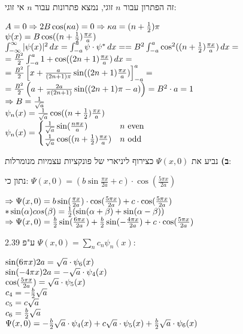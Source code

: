 \documentclass[14pt]{extarticle}
\makeatletter
\newenvironment{lefteqs}{%
    \begin{english}%
    \begin{flushleft}%
    \renewcommand{\arraystretch}{1.3}%
    $\begin{array}{@{}l@{}}%
}{%
    \end{array}$%
    \end{flushleft}%
    \end{english}%
}
\makeatother
\begin{document}
זה הפתרון עבור $n$ זוגי, נמצא פתרונות עבור $n$ אי זוגי:
\begin{lefteqs}
    A=0 \Rightarrow 2B\cos(\kappa a)=0 \Rightarrow \kappa a = (n+\frac{1}{2})\pi \\
    \psi(x) = B \cos((n+\frac{1}{2})\frac{\pi x}{a}) \\

    \int_{-\infty}^{\infty} |\psi(x)|^2 \, dx = \int_{-a}^{a} \psi \cdot \psi^{*} \, dx =
    = B^2 \int_{-a}^{a} \cos^2((n+\frac{1}{2})\frac{\pi x}{a}) \, dx = \\
    = \frac{B^2}{2} \int_{-a}^{a} 1 + \cos((2n+1)\frac{\pi x}{a}) \, dx = \\
    = \frac{B^2}{2} \left[ x + \frac{a}{(2n+1)\pi} \sin((2n+1)\frac{\pi x}{a}) \right]_{-a}^{a} = \\
    = \frac{B^2}{2} \left(a + \frac{2a}{\pi(2n+1)}\sin((2n+1)\pi - a) \right) = B^2 \cdot a = 1 \\
    \Rightarrow B = \frac{1}{\sqrt{a}} \\

    \psi_n(x) = \frac{1}{\sqrt{a}} \cos((n+\frac{1}{2})\frac{\pi x}{a}) \\

    \psi_n(x) = \begin{cases}
        \frac{1}{\sqrt{a}} \sin(\frac{n\pi x}{a})               & n \text{ even} \\
        \frac{1}{\sqrt{a}} \cos((n+\frac{1}{2})\frac{\pi x}{a}) & n \text{ odd}
    \end{cases}
\end{lefteqs}

\textbf{ב)}
נביע את $\Psi(x,0)$ כצירוף ליניארי של פונקציות עצמיות מנומרלות:

נתון כי: $\Psi(x,0)=(b\sin\frac{\pi x}{2a}+c)\cdot \cos(\frac{5\pi x}{2a})$

\begin{lefteqs}
    \Rightarrow \Psi(x,0) = b\sin(\frac{\pi x}{2a})\cdot \cos(\frac{5\pi x}{2a}) + c \cdot \cos(\frac{5\pi x}{2a}) \\
    * \sin(\alpha)cos(\beta) = \frac{1}{2}(\sin(\alpha+\beta) + \sin(\alpha-\beta)) \\
    \Rightarrow \Psi(x,0) = \frac{b}{2} \sin(\frac{6\pi x}{2a}) + \frac{b}{2} \sin(-\frac{4\pi x}{2a}) + c \cdot \cos(\frac{5\pi x}{2a}) \\
\end{lefteqs}

ע"פ 2.39 $\Psi(x,0) = \sum_{n} c_n \psi_n(x)$:
\begin{lefteqs}
    \sin(6\pi x){2a} = \sqrt{a} \cdot \psi_6(x) \\
    \sin(-4\pi x){2a} = -\sqrt{a} \cdot \psi_4(x) \\
    \cos(\frac{5\pi x}{2a}) = \sqrt{a} \cdot \psi_5(x) \\
    c_4 = -\frac{b}{2} \sqrt{a} \\
    c_5 = c \sqrt{a} \\
    c_6 = \frac{b}{2} \sqrt{a} \\
    \Psi(x,0) = -\frac{b}{2} \sqrt{a} \cdot \psi_4(x) + c \sqrt{a} \cdot \psi_5(x) + \frac{b}{2} \sqrt{a} \cdot \psi_6(x)
\end{lefteqs}
\end{document}
